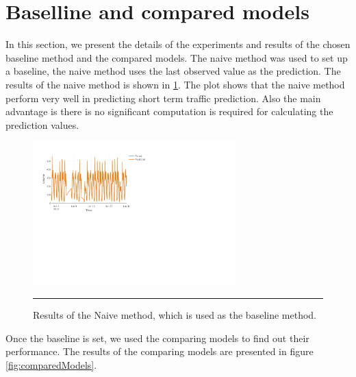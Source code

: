 \section{Baselline and compared models}
In this section, we present the details of the experiments and results of the chosen baseline method
and the compared models. The naive method was used to set up a baseline, the naive method uses
the last observed value as the prediction. The results of the naive method is shown in
\ref{fig:baseline}. The plot shows that the naive method perform very well in predicting short
term traffic prediction. Also the main advantage is there is no significant computation is
required for calculating the prediction values.

\begin{figure}[htbp]
    \centering
    \includegraphics[width=0.7\textwidth]{Plots/naive1.pdf}
    \rule{35em}{0.5pt}
    \caption[Results of the Naive method]{Results of the Naive method, which is used as the baseline method.}
    \label{fig:baseline}
\end{figure}


Once the baseline is set, we used the comparing models to find out their performance. The results of
the comparing models are presented in figure \ref{fig:comparedModels}.


